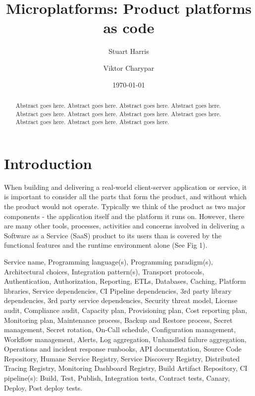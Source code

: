 \documentclass[reprint,amsmath,amssymb,aps]{revtex4-1}
\begin{document}

\title{Microplatforms: Product platforms as code}%

\author{Stuart Harris}
\author{Viktor Charypar}%

\date{\today}%

\begin{abstract}
Abstract goes here. Abstract goes here. Abstract goes here. Abstract goes here. Abstract goes here. 
Abstract goes here. Abstract goes here. Abstract goes here. Abstract goes here. Abstract goes here. Abstract goes here. 
\end{abstract}

\maketitle


\section{\label{sec:introduction}Introduction}


When building and delivering a real-world client-server application or service, it is important to consider all the parts that form the product, and without which the product would not operate. Typically we think of the product as two major components - the application itself and the platform it runs on. However, there are many other tools, processes, activities and concerns involved in delivering a Software as a Service (SaaS) product to its users than is covered by the functional features and the runtime environment alone (See Fig 1). 

Service name, Programming language(s), Programming paradigm(s), Architectural choices, Integration pattern(s), Transport protocols, Authentication, Authorization, Reporting, ETLs, Databases, Caching, Platform libraries, Service dependencies, CI Pipeline dependencies, 3rd party library dependencies, 3rd party service dependencies, Security threat model, License audit, Compliance audit, Capacity plan, Provisioning plan, Cost reporting plan, Monitoring plan, Maintenance process, Backup and Restore process, Secret management, Secret rotation, On-Call schedule, Configuration management, Workflow management, Alerts, Log aggregation, Unhandled failure aggregation, Operations and incident response runbooks, API documentation, Source Code Repository, Humane Service Registry, Service Discovery Registry, Distributed Tracing Registry, Monitoring Dashboard Registry, Build Artifact Repository, CI pipeline(s): Build, Test, Publish, Integration tests, Contract tests, Canary, Deploy, Post deploy tests.
\end{document}
